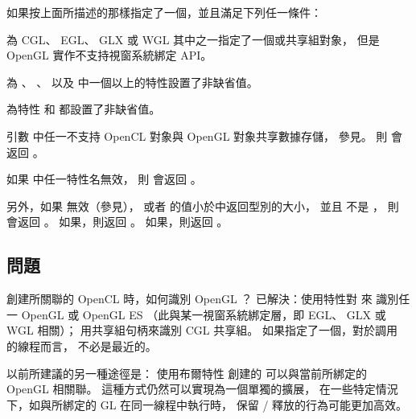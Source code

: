 如果按上面所描述的那樣指定了一個，並且滿足下列任一條件：
\startigBase[indentnext=no]
\item 為 CGL、 EGL、 GLX 或 WGL 其中之一指定了一個或共享組對象，
但是 OpenGL 實作不支持視窗系統綁定 API。

\item 為 、 、
  以及  中一個以上的特性設置了非缺省值。

\item 為特性  和  都設置了非缺省值。

\item 引數  中任一不支持 OpenCL 對象與 OpenGL 對象共享數據存儲，
參見\insection[clShareGl]。
\stopigBase
則  會返回 。

如果  中任一特性名無效，
則  會返回 。

另外，如果  無效（參見），
或者  的值小於中返回型別的大小，
並且  不是 ，
則  會返回 。
如果\schostfailres，則返回 。
如果\scdevfailres，則返回 。

\stopreplacepar

\subsection{問題}

\startQUESTION
創建所關聯的 OpenCL 時，如何識別 OpenGL ？
\stopQUESTION
\startANSWER
已解決：使用特性對  來
識別任一 OpenGL 或 OpenGL ES 
（此與某一視窗系統綁定層，即 EGL、 GLX 或 WGL 相關）；
用共享組句柄來識別 CGL 共享組。
如果指定了一個，對於調用  的線程而言，
不必是最近的。

以前所建議的另一種途徑是：
使用布爾特性  創建的
可以與當前所綁定的 OpenGL 相關聯。
這種方式仍然可以實現為一個單獨的擴展，
在一些特定情況下，如與所綁定的 GL 在同一線程中執行時，
保留 / 釋放的行為可能更加高效。
\stopANSWER

